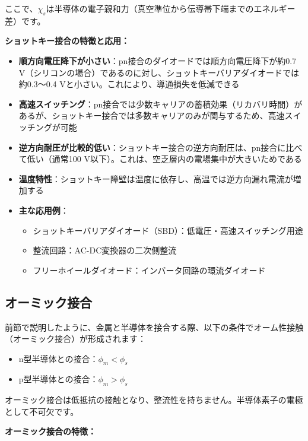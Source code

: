 ここで、$\chi_s$は半導体の電子親和力（真空準位から伝導帯下端までのエネルギー差）です。

\textbf{ショットキー接合の特徴と応用：}

\begin{itemize}
\item \textbf{順方向電圧降下が小さい}：pn接合のダイオードでは順方向電圧降下が約0.7 V（シリコンの場合）であるのに対し、ショットキーバリアダイオードでは約0.3〜0.4 Vと小さい。これにより、導通損失を低減できる

\item \textbf{高速スイッチング}：pn接合では少数キャリアの蓄積効果（リカバリ時間）があるが、ショットキー接合では多数キャリアのみが関与するため、高速スイッチングが可能

\item \textbf{逆方向耐圧が比較的低い}：ショットキー接合の逆方向耐圧は、pn接合に比べて低い（通常100 V以下）。これは、空乏層内の電場集中が大きいためである

\item \textbf{温度特性}：ショットキー障壁は温度に依存し、高温では逆方向漏れ電流が増加する

\item \textbf{主な応用例}：
\begin{itemize}
\item ショットキーバリアダイオード（SBD）：低電圧・高速スイッチング用途
\item 整流回路：AC-DC変換器の二次側整流
\item フリーホイールダイオード：インバータ回路の環流ダイオード
\end{itemize}
\end{itemize}

\subsection{オーミック接合}

前節で説明したように、金属と半導体を接合する際、以下の条件でオーム性接触（オーミック接合）が形成されます：
\begin{itemize}
\item n型半導体との接合：$\phi_m < \phi_s$
\item p型半導体との接合：$\phi_m > \phi_s$
\end{itemize}

オーミック接合は低抵抗の接触となり、整流性を持ちません。半導体素子の電極として不可欠です。

\textbf{オーミック接合の特徴：}

